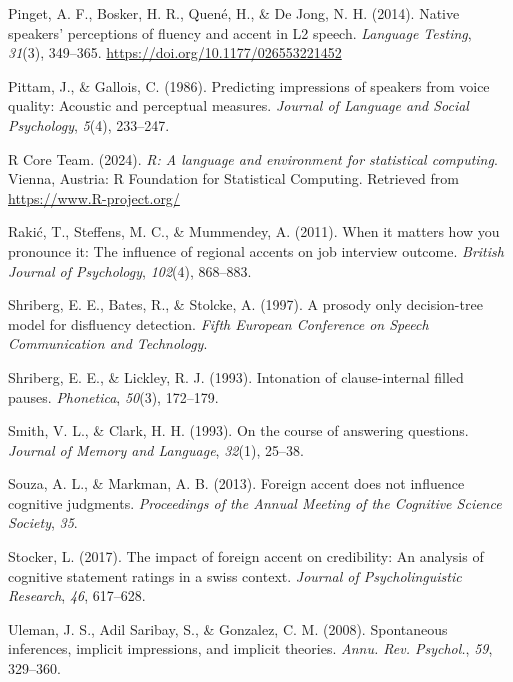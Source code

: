 \documentclass[
  man,floatsintext]{apa7}
\newlength{\cslhangindent}
\newlength{\cslentryspacingunit} %
\newenvironment{CSLReferences}[2] %
 {%
  \setlength{\parindent}{0pt}
  \ifodd #1
  \let\oldpar\par
  \def\par{\hangindent=\cslhangindent\oldpar}
  \fi
  \setlength{\parskip}{#2\cslentryspacingunit}
 }%
 {}
\begin{document}
\begin{CSLReferences}{1}{0}
\leavevmode{}%
Pinget, A. F., Bosker, H. R., Quené, H., \& De Jong, N. H. (2014). Native speakers' perceptions of fluency and accent in {L2} speech. \emph{Language Testing}, \emph{31}(3), 349--365. \url{https://doi.org/10.1177/026553221452}

\leavevmode{}%
Pittam, J., \& Gallois, C. (1986). Predicting impressions of speakers from voice quality: Acoustic and perceptual measures. \emph{Journal of Language and Social Psychology}, \emph{5}(4), 233--247.

\leavevmode{}%
R Core Team. (2024). \emph{R: A language and environment for statistical computing}. Vienna, Austria: R Foundation for Statistical Computing. Retrieved from \url{https://www.R-project.org/}

\leavevmode{}%
Rakić, T., Steffens, M. C., \& Mummendey, A. (2011). When it matters how you pronounce it: The influence of regional accents on job interview outcome. \emph{British Journal of Psychology}, \emph{102}(4), 868--883.

\leavevmode{}%
Shriberg, E. E., Bates, R., \& Stolcke, A. (1997). A prosody only decision-tree model for disfluency detection. \emph{Fifth European Conference on Speech Communication and Technology}.

\leavevmode{}%
Shriberg, E. E., \& Lickley, R. J. (1993). Intonation of clause-internal filled pauses. \emph{Phonetica}, \emph{50}(3), 172--179.

\leavevmode{}%
Smith, V. L., \& Clark, H. H. (1993). On the course of answering questions. \emph{Journal of Memory and Language}, \emph{32}(1), 25--38.

\leavevmode{}%
Souza, A. L., \& Markman, A. B. (2013). Foreign accent does not influence cognitive judgments. \emph{Proceedings of the Annual Meeting of the Cognitive Science Society}, \emph{35}.

\leavevmode{}%
Stocker, L. (2017). The impact of foreign accent on credibility: An analysis of cognitive statement ratings in a swiss context. \emph{Journal of Psycholinguistic Research}, \emph{46}, 617--628.

\leavevmode{}%
Uleman, J. S., Adil Saribay, S., \& Gonzalez, C. M. (2008). Spontaneous inferences, implicit impressions, and implicit theories. \emph{Annu. Rev. Psychol.}, \emph{59}, 329--360.


\end{CSLReferences}
\end{document}
